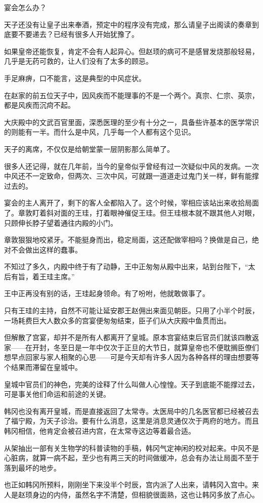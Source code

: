 宴会怎么办？

天子还没有让皇子出来奉酒，预定中的程序没有完成，那么请皇子出阁读的奏章到底要不要递去？已经有很多人开始犹豫了。

如果皇帝还能恢复，肯定不会有人起异心。但赵顼的病可不是感冒发烧那般轻易，几乎是无药可救的，让人们没有了太多的顾忌。

手足麻痹，口不能言，这是典型的中风症状。

在赵家的前五位天子中，因风疾而不能理事的不是一个两个。真宗、仁宗、英宗，都是风疾而沉疴不起。

大庆殿中的文武百官里面，深悉医理的至少有十分之一，具备些许基本的医学常识的则能有一半。而什么是中风，几乎每一个人都有这个见识。

天子的离席，不仅仅是给朝堂蒙一层阴影那么简单了。

很多人还记得，就在几年前，当今的皇帝似乎曾经有过一次疑似中风的发病。一次中风还不一定致命，但两次、三次中风，可就跟一道道走过鬼门关一样，鲜有能撑过去的。

宴会的主人离开了，剩下的客人全都陷入了。这个时候，宰相应该站出来收拾局面了。章敦盯着斜对面的王珪，打着眼神催促王珪。但王珪根本就不跟其他人对眼，只顾伸长脖子望着通往内殿的小门。

章敦狠狠地咬紧牙。不能挺身而出，稳定局面，这还配做宰相吗？换做是自己，绝对不会做出这样的蠢事。

不知过了多久，内殿中终于有了动静，王中正匆匆从殿中出来，站到台陛下，“太后有旨，着王珪主席。”

王中正再没有别的话，王珪起身领命。有了吩咐，他就敢做事了。

只有王珪的主持，自然不可能让延安郡王赵佣出来面见朝臣。只用了小半个时辰，一场耗费巨大人数众多的宫宴便匆匆结束，臣子们从大庆殿中鱼贯而出。

但解散了宫宴，却并不是所有人都离开了皇城。原本宫宴结束后官员们就该四散返家——在开封，冬至日是一年中仅次于正旦的大节日，就算皇帝也不便耽搁臣僚们想早点回家与家人相聚的心思——可是今天却有许多人因为各种各样的理由想要等个结果而滞留在皇城中。

皇城中官员们的神色，完美的诠释了什么叫做人心惶惶。天子到底能不能撑过去，可是事关他们命运和前途的关键。

韩冈也没有离开皇城，而是直接返回了太常寺。太医局中的几名医官都已经被召去了福宁殿，为天子诊治。要有什么消息，这里是消息灵通仅次于两府的地方。而且韩冈相信，他肯定会被召进内宫，在太常寺这边等着最合适。

从架抽出一部有关生物学的科普读物的手稿，韩冈气定神闲的校对起来。中风不是心脏病，就算一病不起，至少也有两三天的时间做缓冲，总会有办法让局面不至于落到最坏的地步。

也正如韩冈所预料，刚刚坐下来没半个时辰，宫内派了人出来，请韩冈入宫中。来人是赵顼身边的内侍，虽然名字不清楚，但相貌很面熟，这也让韩冈多放了点心。


